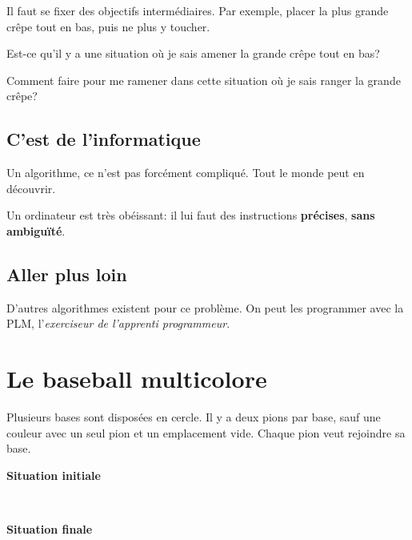 \documentclass[a7paper,pagesize,DIV=14,10pt]{scrbook}
\begin{document}
Il faut se fixer des objectifs intermédiaires. Par exemple, placer la
plus grande crêpe tout en bas, puis ne plus y toucher.

\smallskip
Est-ce qu'il y a une situation où je sais amener la grande crêpe tout en bas?

\smallskip
Comment faire pour me ramener dans cette situation où je sais ranger la grande crêpe?

\vspace{-.6\baselineskip}
\subsection*{C'est de l'informatique}
\vspace{-.5\baselineskip}

Un algorithme, ce n'est pas forcément compliqué. Tout le monde peut en découvrir.

\smallskip
Un ordinateur est très obéissant: il lui faut des instructions
\textbf{précises}, \textbf{sans ambiguïté}.

\vspace{-.6\baselineskip}
\subsection*{Aller plus loin}
\vspace{-.5\baselineskip}
D'autres algorithmes existent pour ce problème. On peut les programmer
avec la PLM, l'\textit{exerciseur de l'apprenti programmeur}.%

\newpage
\section*{Le baseball multicolore}


\vspace{-.5\baselineskip} %
Plusieurs bases sont disposées en cercle.  Il y a deux pions par base,
sauf une couleur avec un seul pion et un emplacement vide.  Chaque
pion veut rejoindre sa base.

\begin{minipage}{.5\linewidth}\center
 \textbf{Situation initiale} 
\end{minipage}~
\begin{minipage}{.5\linewidth}\center
  \textbf{Situation finale}
\end{minipage}
\end{document}
